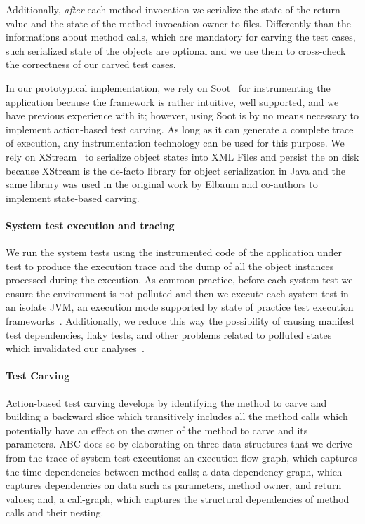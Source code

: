 \documentclass[10pt,conference]{IEEEtran}
\newcommand{\abc}{\textsf{ABC}\xspace}
\begin{document}
Additionally, \emph{after} each method invocation we serialize the state of the return value and the state of the method invocation owner to files. Differently than the informations about method calls, which are mandatory for carving the test cases, such serialized state of the objects are optional and we use them to cross-check the correctness of our carved test cases.

In our prototypical implementation, we rely on Soot~\cite{} for instrumenting the application because the framework is rather intuitive, well supported, and we have previous experience with it; however, using Soot is by no means necessary to implement action-based test carving. As long as it can generate a complete trace of execution, any instrumentation technology can be used for this purpose. We rely on XStream~\cite{} to serialize object states into XML Files and persist the on disk because XStream is the de-facto library for object serialization in Java and the same library was used in the original work by Elbaum and co-authors to implement state-based carving.

\paragraph{System test execution and tracing}
We run the system tests using the instrumented code of the application under test to produce the execution trace and the dump of all the object instances processed during the execution. As common practice, before each system test we ensure the environment is not polluted and then we execute each system test in an isolate JVM, an execution mode supported by state of practice test execution frameworks~\cite{surefire-fork-isolate}. Additionally, we reduce this way the possibility of causing manifest test dependencies, flaky tests, and other problems related to polluted states which invalidated our analyses~\cite{Glicoric-or-Giory, Gambi,Bell,Ernt-DTD}.

\paragraph{Test Carving} 
Action-based test carving develops by identifying the method to carve and building a backward
slice which transitively includes all the method calls which potentially have an effect on the owner
of the method to carve and its parameters.
\abc does so by elaborating on three data structures that we derive from the trace of system test executions:
an execution flow graph, which captures the time-dependencies between method calls;
a data-dependency graph, which captures dependencies on data such as parameters, method owner, and return values;
and, a call-graph, which captures the structural dependencies of method calls and their nesting.
\end{document}

